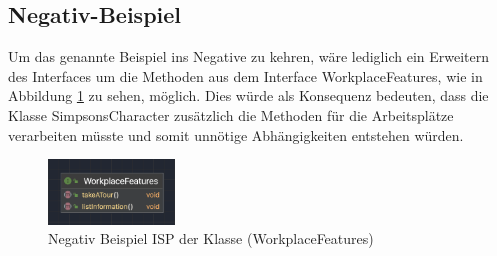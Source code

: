 \subsection{Negativ-Beispiel}
Um das genannte Beispiel ins Negative zu kehren, wäre lediglich ein Erweitern des Interfaces um die Methoden aus dem Interface WorkplaceFeatures, wie in Abbildung \ref{fig:UMLWorkplaceFeatures} zu sehen, möglich. Dies würde als Konsequenz bedeuten, dass die Klasse SimpsonsCharacter zusätzlich die Methoden für die Arbeitsplätze verarbeiten müsste und somit unnötige Abhängigkeiten entstehen würden.
\begin{figure}[ht]
    \centering
    \includegraphics[width=0.3\textwidth]{Bilder/WF.png}
    \caption{Negativ Beispiel ISP der Klasse (WorkplaceFeatures)}
    \label{fig:UMLWorkplaceFeatures}
\end{figure}